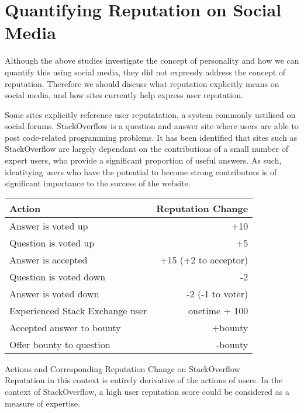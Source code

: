 \section{Quantifying Reputation on Social Media}

Although the above studies investigate the concept of personality and how we can quantify this using social media, they did not expressly address the concept of reputation. Therefore we should discuss what reputation explicitly means on social media, and how sites currently help express user reputation. 

Some sites explicitly reference user reputatation, a system commonly ustilised on social forums. StackOverflow is a question and answer site where users are able to post code-related programming problems. It has been identified that sites such as StackOverflow are largely dependant on the contributions of a small number of expert users, who provide a significant proportion of useful answers. As such, identitying users who have the potential to become strong contributors is of significant importance to the success of the website.\\
\begin{center}
\begin{tabular}{l|r}
 Action & Reputation Change\\ \hline
 Answer is voted up & +10 \\
 Question is voted up & +5 \\
 Answer is accepted & +15 (+2 to acceptor) \\
 Question is voted down & -2 \\
 Answer is voted down & -2 (-1 to voter) \\
 Experienced Stack Exchange user & onetime + 100 \\
 Accepted answer to bounty & +bounty \\
 Offer bounty to question & -bounty \\ 
\end{tabular}
\end{center}
Actions and Corresponding Reputation Change on StackOverflow \cite{movshovitzanalysis}\\


\noindent Reputation in this context is entirely derivative of the actions of users. In the context of StackOverflow, a high user reputation score could be considered as a measure of expertise.

